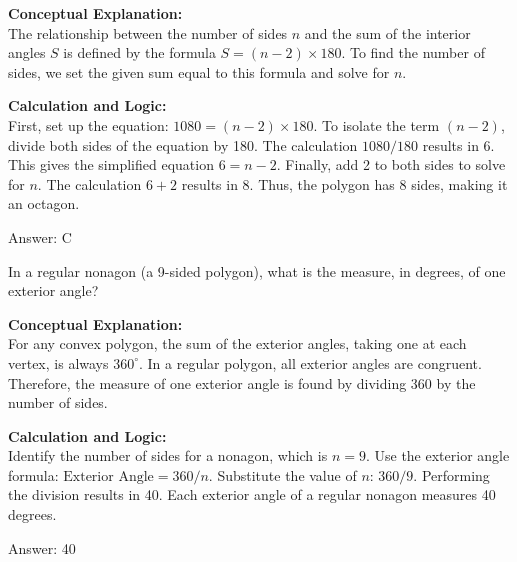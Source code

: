 \documentclass[11pt,paper=a4,answers]{exam}
\begin{document}
\begin{questions}
\begin{solution}
\textbf{Conceptual Explanation:} \\
The relationship between the number of sides $n$ and the sum of the interior angles $S$ is defined by the formula $S = (n - 2) \times 180$. To find the number of sides, we set the given sum equal to this formula and solve for $n$.

\vspace{30pt}

\textbf{Calculation and Logic:} \\
First, set up the equation: $1080 = (n - 2) \times 180$. To isolate the term $(n - 2)$, divide both sides of the equation by 180. The calculation $1080 / 180$ results in 6. This gives the simplified equation $6 = n - 2$. Finally, add 2 to both sides to solve for $n$. The calculation $6 + 2$ results in 8. Thus, the polygon has 8 sides, making it an octagon.

\vspace{30pt}

Answer: \colorbox{yellow!100}{C}
\end{solution}

\vspace{60pt}

\question
In a regular nonagon (a 9-sided polygon), what is the measure, in degrees, of one exterior angle?

\begin{solution}
\textbf{Conceptual Explanation:} \\
For any convex polygon, the sum of the exterior angles, taking one at each vertex, is always $360^\circ$. In a regular polygon, all exterior angles are congruent. Therefore, the measure of one exterior angle is found by dividing 360 by the number of sides.

\vspace{30pt}

\textbf{Calculation and Logic:} \\
Identify the number of sides for a nonagon, which is $n = 9$. Use the exterior angle formula: $\text{Exterior Angle} = 360 / n$. Substitute the value of $n$: $360 / 9$. Performing the division results in 40. Each exterior angle of a regular nonagon measures 40 degrees.

\vspace{30pt}

Answer: \colorbox{yellow!100}{40}
\end{solution}


\end{questions}
\end{document}
